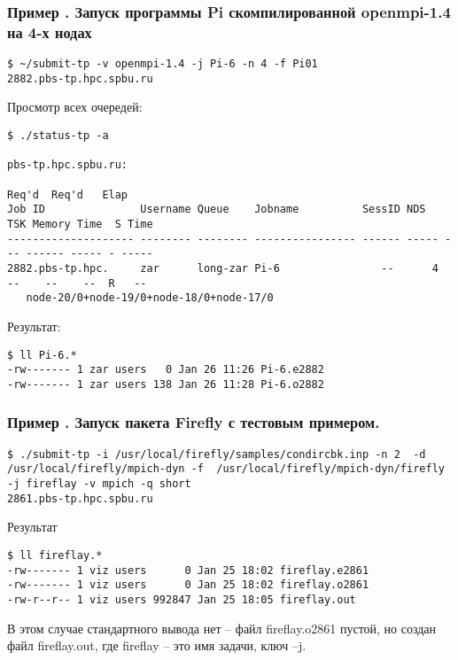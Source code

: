 \documentclass[a4paper,8pt]{extreport}
\newcounter{ex}
\begin{document}
\subsubsection{Пример . Запуск программы Pi скомпилированной openmpi-1.4 на 4-х нодах}
\begin{lstlisting}
$ ~/submit-tp -v openmpi-1.4 -j Pi-6 -n 4 -f Pi01 
2882.pbs-tp.hpc.spbu.ru
\end{lstlisting}

Просмотр всех очередей: 
\begin{lstlisting}
$ ./status-tp -a

pbs-tp.hpc.spbu.ru: 
                                                                         Req'd  Req'd   Elap
Job ID               Username Queue    Jobname          SessID NDS   TSK Memory Time  S Time
-------------------- -------- -------- ---------------- ------ ----- --- ------ ----- - -----
2882.pbs-tp.hpc.     zar      long-zar Pi-6                --      4  --    --    --  R   -- 
   node-20/0+node-19/0+node-18/0+node-17/0
\end{lstlisting}

Результат:
\begin{lstlisting}
$ ll Pi-6.*
-rw------- 1 zar users   0 Jan 26 11:26 Pi-6.e2882
-rw------- 1 zar users 138 Jan 26 11:28 Pi-6.o2882
\end{lstlisting}

\hypertarget{Firefly_ex}{\subsubsection{Пример . Запуск пакета Firefly с тестовым примером.}}
\begin{lstlisting}
$ ./submit-tp -i /usr/local/firefly/samples/condircbk.inp -n 2  -d /usr/local/firefly/mpich-dyn -f  /usr/local/firefly/mpich-dyn/firefly -j fireflay -v mpich -q short
2861.pbs-tp.hpc.spbu.ru
\end{lstlisting}

Результат
\begin{lstlisting}
$ ll fireflay.*
-rw------- 1 viz users      0 Jan 25 18:02 fireflay.e2861
-rw------- 1 viz users      0 Jan 25 18:02 fireflay.o2861
-rw-r--r-- 1 viz users 992847 Jan 25 18:05 fireflay.out
\end{lstlisting}

В этом случае стандартного вывода нет – файл fireflay.o2861 пустой, но создан файл fireflay.out, где fireflay – это имя задачи, ключ –j.
\end{document}
